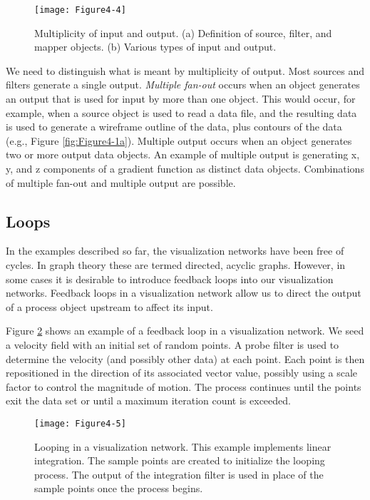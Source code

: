 \begin{figure}[!htb]
  \centering
  \texttt{[image: Figure4-4]}\\
  \caption{Multiplicity of input and output. (a) Definition of source, filter, and mapper objects. (b) Various types of input and output.}\label{fig:Figure4-4}
\end{figure}

We need to distinguish what is meant by multiplicity of output. Most sources and filters generate a single output. \emph{Multiple fan-out} occurs when an object generates an output that is used for input by more than one object. This would occur, for example, when a source object is used to read a data file, and the resulting data is used to generate a wireframe outline of the data, plus contours of the data (e.g., Figure \ref{fig:Figure4-1a}). Multiple output occurs when an object generates two or more output data objects. An example of multiple output is generating x, y, and z components of a gradient function as distinct data objects. Combinations of multiple fan-out and multiple output are possible.

\subsection{Loops}
\label{subsec:loops}

In the examples described so far, the visualization networks have been free of cycles. In graph theory these are termed directed, acyclic graphs. However, in some cases it is desirable to introduce feedback loops into our visualization networks. Feedback loops in a visualization network allow us to direct the output of a process object upstream to affect its input.

Figure \ref{fig:Figure4-5} shows an example of a feedback loop in a visualization network. We seed a velocity field with an initial set of random points. A probe filter is used to determine the velocity (and possibly other data) at each point. Each point is then repositioned in the direction of its associated vector value, possibly using a scale factor to control the magnitude of motion. The process continues until the points exit the data set or until a maximum iteration count is exceeded.

\begin{figure}[!htb]
  \centering
  \texttt{[image: Figure4-5]}\\
  \caption{Looping in a visualization network. This example implements linear integration. The sample points are created to initialize the looping process. The output of the integration filter is used in place of the sample points once the process begins.}\label{fig:Figure4-5}
\end{figure}

